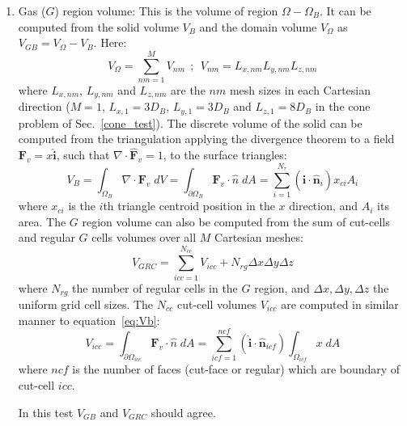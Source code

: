 \documentclass[11pt]{book}
\begin{document}
\begin{enumerate}
    \item Gas ($G$) region volume:
    This is the volume of region $\Omega-\Omega_B$. It can be computed from the solid volume $V_B$ and the domain volume $V_\Omega$ as $V_{GB}=V_\Omega-V_B$. Here:
    \begin{equation}
       V_\Omega=\sum_{nm=1}^M {V_{nm}} \: \: ; \: \: V_{nm}=L_{x,nm} L_{y,nm} L_{z,nm}
    \end{equation}
    where $L_{x,nm}$, $L_{y,nm}$ and $L_{z,nm}$ are the $nm$ mesh sizes in each Cartesian direction ($M=1$, $L_{x,1}=3D_B$, $L_{y,1}=3D_B$ and $L_{z,1}=8D_B$ in the cone problem of Sec.~\ref{cone_test}). The discrete volume of the solid can be computed from the triangulation applying the divergence theorem to a field $\mathbf{F}_v=x \mathbf{\hat{i}}$, such that $\nabla \cdot \mathbf{\hat{F}}_v=1$, to the surface triangles:
    \begin{equation}
      V_B = \int_{\Omega _{B}} \nabla \cdot \mathbf{F}_v \; dV =
      \int_{\partial \Omega _{B}}  \mathbf{F}_v \cdot \hat{n} \; dA =
      \sum_{i=1}^{N_\tau}{(\mathbf{\hat{i}} \cdot \mathbf{\hat{n}}_i) x_{ci} A_i}
      \label{eq:Vb}
    \end{equation}
    where $x_{ci}$ is the $i$th triangle centroid position in the $x$ direction, and $A_i$ its area.
    The $G$ region volume can also be computed from the sum of cut-cells and regular $G$ cells volumes over all $M$ Cartesian meshes:
    \begin{equation}
       V_{GRC} = \sum_{icc=1}^{N_{cc}}{V_{icc}} + N_{rg} \Delta x \Delta y \Delta z
       \label{}
    \end{equation}
    where $N_{rg}$ the number of regular cells in the $G$ region, and $\Delta x,\Delta y,\Delta z$ the uniform grid cell sizes. The  $N_{cc}$ cut-cell volumes $V_{icc}$ are computed in similar manner to equation~\eqref{eq:Vb}:
    \begin{equation}
    V_{icc} = \int_{\partial \Omega _{icc}}  \mathbf{F}_v \cdot \hat{n} \; dA =
    \sum_{icf=1}^{ncf} (\mathbf{\hat{i}} \cdot \mathbf{\hat{n}}_{icf}) \int_{\Omega _{icf}} x \; dA
    \label{eq:vol2}
    \end{equation}
    where $ncf$ is the number of faces (cut-face or regular) which are boundary of cut-cell $icc$.

    In this test $V_{GB}$ and $V_{GRC}$ should agree.
    \newline


\end{enumerate}
\end{document}
